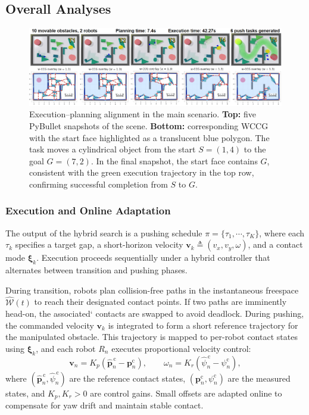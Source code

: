 \subsection{Overall Analyses}\label{subsec:overall}
\begin{figure}[t!]
  \centering
  \includegraphics[width=1\linewidth]{figures/sim_exp.png}
  \vspace{-2mm}
\caption{Execution--planning alignment in the main scenario. 
\textbf{Top:} five PyBullet snapshots of the scene. 
\textbf{Bottom:} corresponding WCCG with the start face highlighted as a translucent blue polygon.
The task moves a cylindrical object from the start \(S=(1,4)\) to the goal \(G=(7,2)\). 
In the final snapshot, the start face contains \(G\), 
consistent with the green execution trajectory in the top row, 
confirming successful completion from \(S\) to \(G\). 
}
\end{figure}


\subsubsection{Execution and Online Adaptation}\label{subsec:execute}
The output of the hybrid search is a pushing schedule
$\pi=\{\tau_1,\cdots,\tau_K\}$, where each $\tau_k$ specifies a target gap, a
short-horizon velocity $\mathbf{v}_k\triangleq(v_x,v_y,\omega)$, and a contact
mode $\boldsymbol{\xi}_k$. Execution proceeds sequentially under a hybrid
controller that alternates between transition and pushing phases.

During transition, robots plan collision-free paths in the
instantaneous freespace $\widehat{\mathcal{W}}(t)$ to reach their designated
contact points. If two paths are imminently head-on, the associated`
contacts are swapped to avoid deadlock.
During pushing, the commanded velocity $\mathbf{v}_k$ is integrated to form a
short reference trajectory for the manipulated obstacle. This trajectory is
mapped to per-robot contact states using $\boldsymbol{\xi}_k$, and each robot
$R_n$ executes proportional velocity control:
\[
\mathbf{v}_n = K_{\!p}\!\left(\widehat{\mathbf{p}}^{\,\text{c}}_n - \mathbf{p}^{\text{c}}_n\right),
\qquad
\omega_n = K_{\!r}\!\left(\widehat{\psi}^{\,\text{c}}_n - \psi^{\text{c}}_n\right),
\]
where $(\widehat{\mathbf{p}}^{\,\text{c}}_n,\widehat{\psi}^{\,\text{c}}_n)$ are
the reference contact states, $(\mathbf{p}^{\text{c}}_n,\psi^{\text{c}}_n)$ are
the measured states, and $K_{\!p},K_{\!r}>0$ are control gains. Small offsets
are adapted online to compensate for yaw drift and maintain stable contact.

